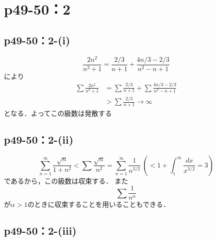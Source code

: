 \documentclass[a4paper,10pt,fleqn]{ltjsarticle}
\begin{document}
\section*{p49-50：2}


\subsection*{p49-50：2-(i)}

\begin{screen}
	\[
	\frac{2n^2}{n^3+1}=\frac{2/3}{n+1}+\frac{4n/3-2/3}{n^2-n+1}
	\]
	により
	\begin{align*}
	\sum \frac{2n^2}{n^3+1}&=\sum \frac{2/3}{n+1}+\sum \frac{4n/3-2/3}{n^2-n+1} \\
	&>\sum \frac{2/3}{n+1} \rightarrow \infty
	\end{align*}
	となる．よってこの級数は発散する
	\end{screen}
	

    \subsection*{p49-50：2-(ii)}

	\begin{screen}
	\[
	\sum ^{\infty}_{n=1}\frac{\sqrt{n}}{1+n^2}<\sum \frac{\sqrt{n}}{n^2}=\sum^{\infty}_{n=1}\frac{1}{n^{3/2}}~\left(<1+\int^{\infty}_{1}\frac{dx}{x^{3/2}}=3\right)
	\]
    であるから，この級数は収束する．
	また
	\[
	\sum \frac{1}{n^\alpha}
	\]
	が$\alpha >1$のときに収束することを用いることもできる．
	\end{screen}


    \subsection*{p49-50：2-(iii)}
\end{document}
